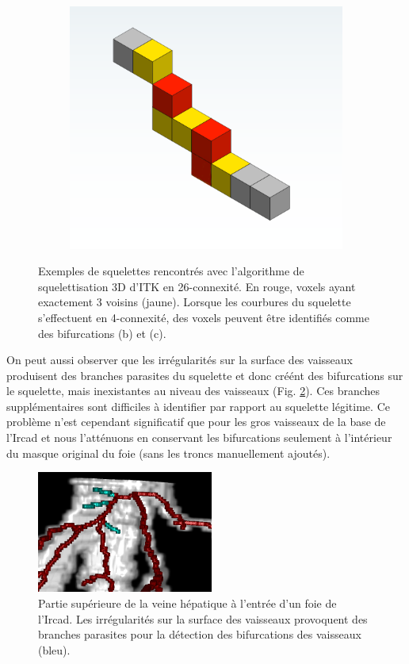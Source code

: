 \begin{figure}[!ht]
\begin{subfigure}{0.32\textwidth}
    \centering
    \includegraphics[width=\textwidth]{Images/problem_skel2.png}
    \caption{}
  \end{subfigure}

  \caption{Exemples de squelettes rencontrés avec l'algorithme de squelettisation 3D d'ITK en 26-connexité. En rouge, voxels ayant exactement 3 voisins (jaune). Lorsque les courbures du squelette s'effectuent en 4-connexité, des voxels peuvent être identifiés comme des bifurcations (b) et (c).}
  \label{fig:skel_illustration}
\end{figure}

On peut aussi observer que les irrégularités sur la surface des vaisseaux produisent des branches parasites du squelette et donc créént des bifurcations sur le squelette, mais inexistantes au niveau des vaisseaux (Fig. \ref{fig:barbelures}). Ces branches supplémentaires sont difficiles à identifier par rapport au squelette légitime. Ce problème n'est cependant significatif que pour les gros vaisseaux de la base de l'Ircad et nous l'atténuons en conservant les bifurcations seulement à l'intérieur du masque original du foie (sans les troncs manuellement ajoutés).

\begin{figure}[!ht]
  \centering
  \includegraphics[height=4cm]{Images/barbelures.png}
  \caption{Partie supérieure de la veine hépatique à l'entrée d'un foie de l'Ircad. Les irrégularités sur la surface des vaisseaux provoquent des branches parasites pour la détection des bifurcations des vaisseaux (bleu).}
  \label{fig:barbelures}
\end{figure}


